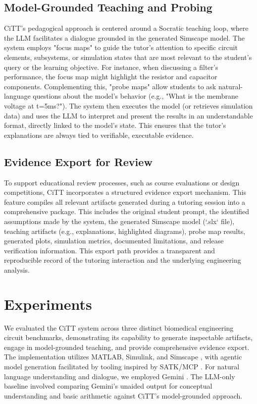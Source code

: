 \documentclass[10pt,twocolumn,letterpaper]{article}
\begin{document}
\subsection{Model-Grounded Teaching and Probing}
\label{sec:method_teaching}
CiTT's pedagogical approach is centered around a Socratic teaching loop, where the LLM facilitates a dialogue grounded in the generated Simscape model. The system employs "focus maps" to guide the tutor's attention to specific circuit elements, subsystems, or simulation states that are most relevant to the student's query or the learning objective. For instance, when discussing a filter's performance, the focus map might highlight the resistor and capacitor components. Complementing this, "probe maps" allow students to ask natural-language questions about the model's behavior (e.g., "What is the membrane voltage at t=5ms?"). The system then executes the model (or retrieves simulation data) and uses the LLM to interpret and present the results in an understandable format, directly linked to the model's state. This ensures that the tutor's explanations are always tied to verifiable, executable evidence.

\subsection{Evidence Export for Review}
\label{sec:method_export}
To support educational review processes, such as course evaluations or design competitions, CiTT incorporates a structured evidence export mechanism. This feature compiles all relevant artifacts generated during a tutoring session into a comprehensive package. This includes the original student prompt, the identified assumptions made by the system, the generated Simscape model (`.slx` file), teaching artifacts (e.g., explanations, highlighted diagrams), probe map results, generated plots, simulation metrics, documented limitations, and release verification information. This export path provides a transparent and reproducible record of the tutoring interaction and the underlying engineering analysis.

\section{Experiments}
\label{sec:experiments}
We evaluated the CiTT system across three distinct biomedical engineering circuit benchmarks, demonstrating its capability to generate inspectable artifacts, engage in model-grounded teaching, and provide comprehensive evidence export. The implementation utilizes MATLAB, Simulink, and Simscape \cite{mathworks_matlab, mathworks_simulink, mathworks_simscape}, with agentic model generation facilitated by tooling inspired by SATK/MCP \cite{mathworks_satk, matlab_agentic_toolkit}. For natural language understanding and dialogue, we employed Gemini \cite{gemini_api_docs}. The LLM-only baseline involved comparing Gemini's unaided output for conceptual understanding and basic arithmetic against CiTT's model-grounded approach.
\end{document}
